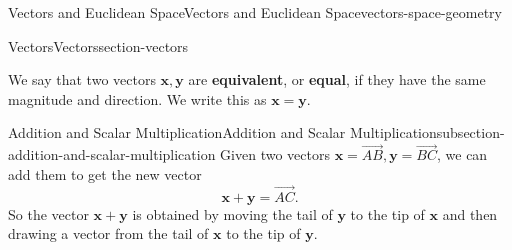 \documentclass[oneside,10pt,]{book}
\newcommand{\terminology}[1]{\textbf{#1}}
\numberwithin{equation}{section}
\newcommand{\vv}[1]{\mathbf{#1}}
\begin{document}
\begin{chapterptx}{Vectors and Euclidean Space}{}{Vectors and Euclidean Space}{}{}{vectors-space-geometry}
\begin{sectionptx}{Vectors}{}{Vectors}{}{}{section-vectors}
\begin{introduction}{}
\hypertarget{p-1083}{}%
We say that two vectors \(\vv{x},\vv{y}\) are \terminology{equivalent}, or \terminology{equal}, if they have the same magnitude and direction. We write this as \(\vv{x} = \vv{y}\).%
\end{introduction}%
%
%
\typeout{************************************************}
\typeout{************************************************}
%
\begin{subsectionptx}{Addition and Scalar Multiplication}{}{Addition and Scalar Multiplication}{}{}{subsection-addition-and-scalar-multiplication}
\hypertarget{p-1084}{}%
Given two vectors \(\vv{x} = \overrightarrow{AB},\vv{y}=\overrightarrow{BC}\), we can add them to get the new vector%
%
\begin{equation*}
\vv{x}+\vv{y} = \overrightarrow{AC}.
\end{equation*}
\hypertarget{p-1085}{}%
So the vector \(\vv{x}+\vv{y}\) is obtained by moving the tail of \(\vv{y}\) to the tip of \(\vv{x}\) and then drawing a vector from the tail of \(\vv{x}\) to the tip of \(\vv{y}\).%
\begin{figure}
\centering
{
}
\end{figure}
\end{subsectionptx}
\end{sectionptx}
\end{chapterptx}
\end{document}
